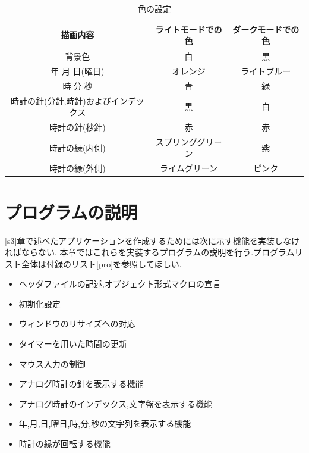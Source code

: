 \documentclass[a4j]{jarticle}
\begin{document}
         \begin{table}[H]
          \caption{色の設定}
        \label{color}
        \begin{center}
            \begin{tabular}{c|c|c}\hline
              描画内容 & ライトモードでの色 & ダークモードでの色 \\ \hline
              背景色 & 白 & 黒 \\
              年 月 日(曜日) &  オレンジ & ライトブルー \\
              時:分:秒 & 青 & 緑 \\
              時計の針(分針,時針)およびインデックス & 黒 & 白 \\
              時計の針(秒針) & 赤 & 赤 \\
              時計の縁(内側) & スプリンググリーン & 紫 \\
              時計の縁(外側) & ライムグリーン & ピンク \\ \hline
            \end{tabular}
        \end{center}
        \end{table}

    \section{プログラムの説明}
    \ref{s3}章で述べたアプリケーションを作成するためには次に示す機能を実装しなければならない.
    本章ではこれらを実装するプログラムの説明を行う.プログラムリスト全体は付録のリスト\ref{pro}を参照してほしい.
    \begin{itemize}
      \item ヘッダファイルの記述,オブジェクト形式マクロの宣言
      \item 初期化設定
      \item ウィンドウのリサイズへの対応
      \item タイマーを用いた時間の更新
      \item マウス入力の制御
      \item アナログ時計の針を表示する機能
      \item アナログ時計のインデックス,文字盤を表示する機能
      \item 年,月,日,曜日,時,分,秒の文字列を表示する機能
      \item 時計の縁が回転する機能 
    \end{itemize}
\end{document}

